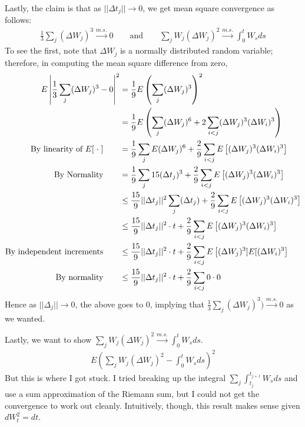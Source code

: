 \documentclass[12pt]{article}
\theoremstyle{plain}
\theoremstyle{definition}
\theoremstyle{remark}
\begin{document}
\begin{enumerate}
\begin{enumerate}
      Lastly, the claim is that as $||\Delta t_j||\rightarrow 0$, we get
      mean square convergence as follows:
      \begin{align*}
        \frac{1}{3}\sum_j (\Delta W_j)^3 \xrightarrow{m.s.} 0
        \qquad\text{and}\qquad
        \sum_j W_j (\Delta W_j)^2 \xrightarrow{m.s.} \int^t_0 W_s ds
      \end{align*}
      To see the first, note that $\Delta W_j$ is a normally distributed
      random variable; therefore, in computing the mean square
      difference from zero,
      \begin{align*}
        E\left\lvert \frac{1}{3} \sum_j (\Delta W_j)^3 - 0\right\rvert^2
        &=\frac{1}{9} E\left( \sum_j (\Delta W_j)^3\right)^2\notag\\
        &=\frac{1}{9} E\left( \sum_j (\Delta W_j)^6
          + 2\sum_{i<j}(\Delta W_j)^3 (\Delta W_i)^3\right)\\
        \text{By linearity of $E[\;\cdot\;]$} \qquad
        &=\frac{1}{9} \sum_j E(\Delta W_j)^6
        + \frac{2}{9}\sum_{i<j} E\left[(\Delta W_j)^3 (\Delta W_i)^3\right]\\
        \text{By Normality} \qquad
        &= \frac{1}{9} \sum_j 15( \Delta t_j)^3
          + \frac{2}{9}\sum_{i<j} E\left[(\Delta W_j)^3 (\Delta W_i)^3\right]\\
        &\leq \frac{15}{9} ||\Delta t_j||^2 \sum_j (\Delta t_j)
          + \frac{2}{9}\sum_{i<j} E\left[(\Delta W_j)^3 (\Delta W_i)^3\right]\\
        &\leq \frac{15}{9} ||\Delta t_j||^2 \cdot t
          + \frac{2}{9}\sum_{i<j} E\left[(\Delta W_j)^3 (\Delta W_i)^3\right]\\
        \text{By independent increments} \qquad
        &\leq \frac{15}{9} ||\Delta t_j||^2 \cdot t
        + \frac{2}{9}\sum_{i<j} E\left[(\Delta W_j)^3] E[(\Delta W_i)^3\right]\\
        \text{By normality} \qquad
        &\leq \frac{15}{9} ||\Delta t_j||^2 \cdot t
        + \frac{2}{9}\sum_{i<j} 0 \cdot 0
      \end{align*}
      Hence as $||\Delta_j||\rightarrow 0$, the above goes to 0,
      implying that $\frac{1}{3}\sum_j (\Delta W_j)^3)
      \xrightarrow{m.s.} 0$ as we wanted.

      Lastly, we want to show $\sum_j W_j (\Delta W_j)^2
      \xrightarrow{m.s.} \int^t_0 W_s ds$.
      \begin{align*}
        E\left( \sum_j W_j (\Delta W_j)^2 - \int^t_0 W_s ds\right)^2
      \end{align*}
      But this is where I got stuck. I tried breaking up the integral
      $\sum_j \int^{t_{j+1}}_{t_j} W_s ds$ and use a sum approximation
      of the Riemann sum, but I could not get the convergence to work
      out cleanly. Intuitively, though, this result makes sense given
      $dW^2_t=dt$.


\end{enumerate}
\end{enumerate}
\end{document}
